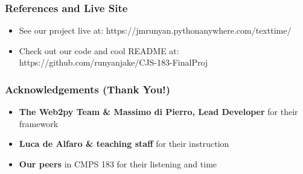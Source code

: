 \documentclass[t]{beamer}
\begin{document}
    \begin{frame}
        \frametitle{References and Live Site}
        \begin{itemize}
          \item See our project live at: https://jmrunyan.pythonanywhere.com/texttime/
          \item Check out our code and cool README at: https://github.com/runyanjake/CJS-183-FinalProj
        \end{itemize}
        \begin{figure}
            \begin{center}
            \end{center}
        \end{figure}
    \end{frame}

    \begin{frame}
        \frametitle{Acknowledgements (Thank You!)}
        \begin{itemize}
          \item \textbf{The Web2py Team \& Massimo di Pierro, Lead Developer} for their framework
          \item \textbf{Luca de Alfaro \& teaching staff} for their instruction
          \item \textbf{Our peers} in CMPS 183 for their listening and time  
        \end{itemize}
    \end{frame}

    
\end{document}
